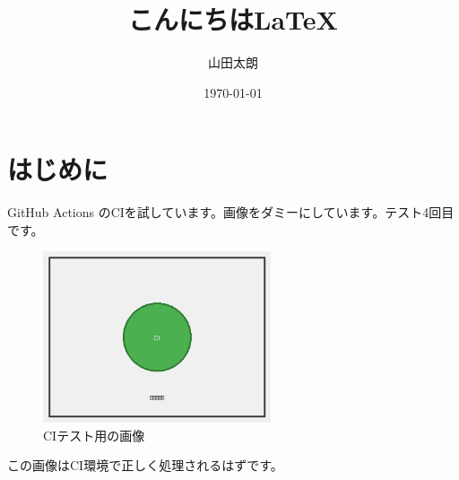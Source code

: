 \documentclass[uplatex]{jsarticle}
\title{こんにちは\LaTeX}
\author{山田太朗}
\date{\today}
\begin{document}
\maketitle

\section{はじめに}

GitHub Actions のCIを試しています。画像をダミーにしています。テスト4回目です。

\begin{figure}[htbp]
	\centering
	\includegraphics[width=0.6\textwidth]{figures/test-image}
	\caption{CIテスト用の画像}
	\label{fig:test-image}
\end{figure}

この画像はCI環境で正しく処理されるはずです。\cite{fujita2020}



\end{document}

